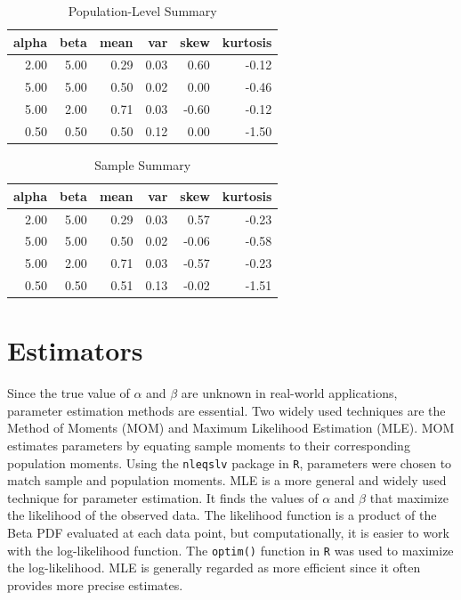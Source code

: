 \documentclass{article}\usepackage[]{graphicx}\usepackage[]{xcolor}
\begin{document}
\begin{multicols}{2}
\begin{table}[H]
\centering
\begingroup\small
\begin{tabular}{rrrrrr}
  \hline
alpha & beta & mean & var & skew & kurtosis \\ 
  \hline
2.00 & 5.00 & 0.29 & 0.03 & 0.60 & -0.12 \\ 
  5.00 & 5.00 & 0.50 & 0.02 & 0.00 & -0.46 \\ 
  5.00 & 2.00 & 0.71 & 0.03 & -0.60 & -0.12 \\ 
  0.50 & 0.50 & 0.50 & 0.12 & 0.00 & -1.50 \\ 
   \hline
\end{tabular}
\endgroup
\caption{Population-Level Summary} 
\label{populationsummary}
\end{table}


\begin{table}[H]
\centering
\begingroup\small
\begin{tabular}{rrrrrr}
  \hline
alpha & beta & mean & var & skew & kurtosis \\ 
  \hline
2.00 & 5.00 & 0.29 & 0.03 & 0.57 & -0.23 \\ 
  5.00 & 5.00 & 0.50 & 0.02 & -0.06 & -0.58 \\ 
  5.00 & 2.00 & 0.71 & 0.03 & -0.57 & -0.23 \\ 
  0.50 & 0.50 & 0.51 & 0.13 & -0.02 & -1.51 \\ 
   \hline
\end{tabular}
\endgroup
\caption{Sample Summary} 
\label{samplestatistics}
\end{table}


\pagebreak
\section{Estimators}
Since the true value of $\alpha$ and $\beta$ are unknown in real-world applications, parameter estimation methods are essential. Two widely used techniques are the Method of Moments (MOM) and Maximum Likelihood Estimation (MLE). MOM estimates parameters by equating sample moments to their corresponding population moments. Using the \texttt{nleqslv} package in \texttt{R}, parameters were chosen to match sample and population moments. MLE is a more general and widely used technique for parameter estimation. It finds the values of $\alpha$ and $\beta$ that maximize the likelihood of the observed data. The likelihood function is a product of the Beta PDF evaluated at each data point, but computationally, it is easier to work with the log-likelihood function. The \texttt{optim()} function in \texttt{R} was used to maximize the log-likelihood. MLE is generally regarded as more efficient since it often provides more precise estimates.


\end{multicols}
\end{document}

